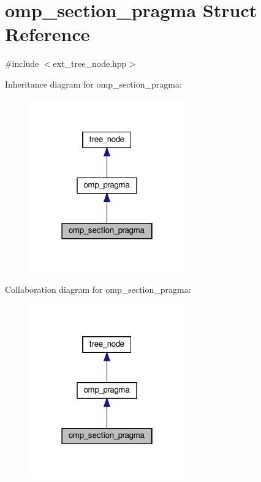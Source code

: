 \hypertarget{structomp__section__pragma}{}\section{omp\+\_\+section\+\_\+pragma Struct Reference}
\label{structomp__section__pragma}


{\ttfamily \#include $<$ext\+\_\+tree\+\_\+node.\+hpp$>$}



Inheritance diagram for omp\+\_\+section\+\_\+pragma\+:
\nopagebreak
\begin{figure}[H]
\begin{center}
\leavevmode
\includegraphics[width=190pt]{d3/d28/structomp__section__pragma__inherit__graph}
\end{center}
\end{figure}


Collaboration diagram for omp\+\_\+section\+\_\+pragma\+:
\nopagebreak
\begin{figure}[H]
\begin{center}
\leavevmode
\includegraphics[width=190pt]{de/d4e/structomp__section__pragma__coll__graph}
\end{center}
\end{figure}
